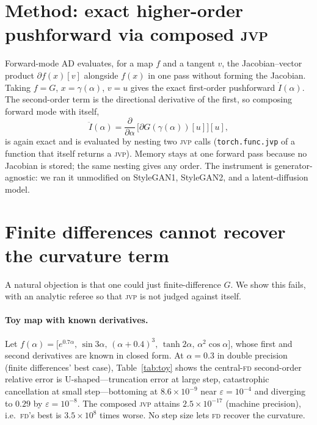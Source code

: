 \documentclass[11pt]{article}
\newcommand{\jvp}{\textsc{jvp}}
\newcommand{\fd}{\textsc{fd}}
\begin{document}
\section{Method: exact higher-order pushforward via composed \jvp}
Forward-mode AD evaluates, for a map $f$ and a tangent $v$, the
Jacobian--vector product $\partial f(x)[v]$ alongside $f(x)$ in one pass without
forming the Jacobian. Taking $f=G$, $x=\gamma(\alpha)$, $v=u$ gives the exact
first-order pushforward $\dot I(\alpha)$. The second-order term is the
directional derivative of the first, so composing forward mode with itself,
\[
\ddot I(\alpha)
=\frac{\partial}{\partial\alpha}\,\big[\partial G(\gamma(\alpha))[u]\big][u],
\]
is again exact and is evaluated by nesting two \jvp{} calls
(\texttt{torch.func.jvp} of a function that itself returns a \jvp). Memory stays
at one forward pass because no Jacobian is stored; the same nesting gives any
order. The instrument is generator-agnostic: we ran it unmodified on StyleGAN1,
StyleGAN2, and a latent-diffusion model.

\section{Finite differences cannot recover the curvature term}
\label{sec:fd}
A natural objection is that one could just finite-difference $G$. We show this
fails, with an analytic referee so that \jvp{} is not judged against itself.

\paragraph{Toy map with known derivatives.}
Let $f(\alpha)=\big[e^{0.7\alpha},\,\sin 3\alpha,\,(\alpha+0.4)^3,\,\tanh
2\alpha,\,\alpha^2\cos\alpha\big]$, whose first and second derivatives are known
in closed form. At $\alpha=0.3$ in double precision (finite differences' best
case), Table~\ref{tab:toy} shows the central-\fd{} second-order relative error
is U-shaped---truncation error at large step, catastrophic cancellation at small
step---bottoming at $8.6\times10^{-9}$ near $\varepsilon=10^{-4}$ and diverging
to $0.29$ by $\varepsilon=10^{-8}$. The composed \jvp{} attains
$2.5\times10^{-17}$ (machine precision), i.e.\ \fd's best is $3.5\times10^{8}$
times worse. No step size lets \fd{} recover the curvature.
\end{document}
